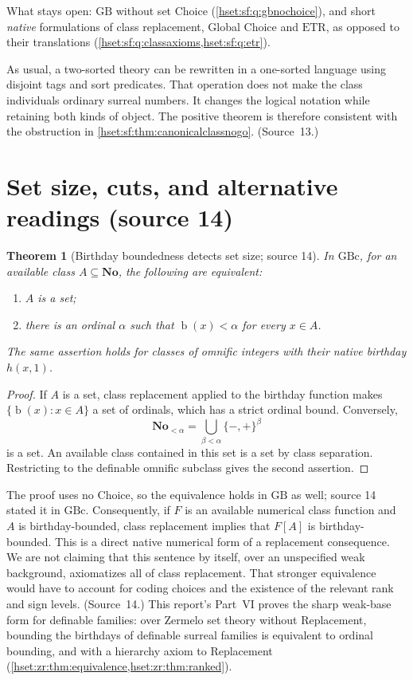 \documentclass[11pt,letterpaper]{article}
\newtheorem{theorem}{Theorem}[section]
\theoremstyle{definition}
\theoremstyle{remark}
\newcommand{\No}{\mathbf{No}}
\newcommand{\bd}{\operatorname{b}}
\newcommand{\GB}{\mathrm{GB}}
\newcommand{\GBc}{\mathrm{GBc}}
\newcommand{\ETR}{\mathrm{ETR}}
\begin{document}
What stays open: $\GB$ without set Choice (\cref{hset:sf:q:gbnochoice}), and short
\emph{native} formulations of class replacement, Global Choice and $\ETR$, as
opposed to their translations (\cref{hset:sf:q:classaxioms,hset:sf:q:etr}).

As usual, a two-sorted theory can be rewritten in a one-sorted language using
disjoint tags and sort predicates. That operation does not make the class
individuals ordinary surreal numbers. It changes the logical notation while
retaining both kinds of object. The positive theorem is therefore consistent with
the obstruction in \cref{hset:sf:thm:canonicalclassnogo}. (Source~13.)

\section{Set size, cuts, and alternative readings (source 14)}
\label{hset:sf:sec:bounds}

\begin{theorem}[Birthday boundedness detects set size; source 14]\label{hset:sf:thm:bounded}
In $\GBc$, for an available class $A\subseteq\No$, the following are equivalent:
\begin{enumerate}[label=\textup{(\roman*)}]
\item $A$ is a set;
\item there is an ordinal $\alpha$ such that $\bd(x)<\alpha$ for every $x\in A$.
\end{enumerate}
The same assertion holds for classes of omnific integers with their native birthday
$h(x,1)$.
\end{theorem}
\begin{proof}
If $A$ is a set, class replacement applied to the birthday function makes
$\{\bd(x):x\in A\}$ a set of ordinals, which has a strict ordinal bound.
Conversely,
\[
 \No_{<\alpha}=\bigcup_{\beta<\alpha}\{-,+\}^{\beta}
\]
is a set. An available class contained in this set is a set by class separation.
Restricting to the definable omnific subclass gives the second assertion.
\end{proof}

The proof uses no Choice, so the equivalence holds in $\GB$ as well; source 14
stated it in $\GBc$. Consequently, if $F$ is an available numerical class function
and $A$ is birthday-bounded, class replacement implies that $F[A]$ is
birthday-bounded. This is a direct native numerical form of a replacement
consequence. We are not claiming that this sentence by itself, over an unspecified
weak background, axiomatizes all of class replacement. That stronger equivalence
would have to account for coding choices and the existence of the relevant rank and
sign levels. (Source~14.) This report's Part~VI proves the sharp weak-base form for
definable families: over Zermelo set theory without Replacement, bounding the
birthdays of definable surreal families is equivalent to ordinal bounding, and with
a hierarchy axiom to Replacement (\cref{hset:zr:thm:equivalence,hset:zr:thm:ranked}).
\end{document}
